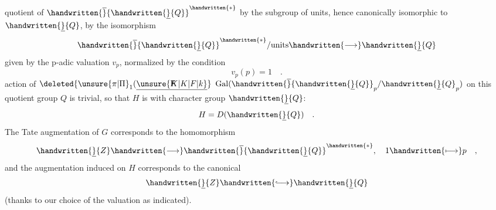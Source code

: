 quotient of $\handwritten{\overline}{\handwritten{\underline}{Q}}^{\handwritten{*}}$ by the subgroup of units, hence canonically isomorphic to $\handwritten{\underline}{Q}$, by the isomorphism
\[
\handwritten{\overline}{\handwritten{\underline}{Q}}^{\handwritten{*}}/\text{units}\handwritten{\longrightarrow}\handwritten{\underline}{Q}
\]
given by the p-adic valuation $v_p$, normalized by the condition
\[
v_p(p)=1\quad .
\]
 action of $\deleted{\unsure{\pi|\Pi}_1(\underline{\unsure{\rlap{F}K|K|F|k}}}$ $\operatorname{Gal}(\handwritten{\overline}{\handwritten{\underline}{Q}}_p/\handwritten{\underline}{Q}_p)$ on this quotient group $Q$ is trivial, so that $H$ is  with character group $\handwritten{\underline}{Q}$:
\[
H=D(\handwritten{\underline}{Q})\quad .
\]
The Tate augmentation of $G$ corresponds to the homomorphism
\[
\handwritten{\underline}{Z}\handwritten{\longrightarrow}\handwritten{\overline}{\handwritten{\underline}{Q}}^{\handwritten{*}},\quad 1\handwritten{\longmapsto}p\quad ,
\]
and the augmentation induced on $H$ corresponds to the canonical 
\[
\handwritten{\underline}{Z}\handwritten{\lhook\joinrel\longrightarrow}\handwritten{\underline}{Q}
\]
(thanks to our choice of the valuation  as indicated).

